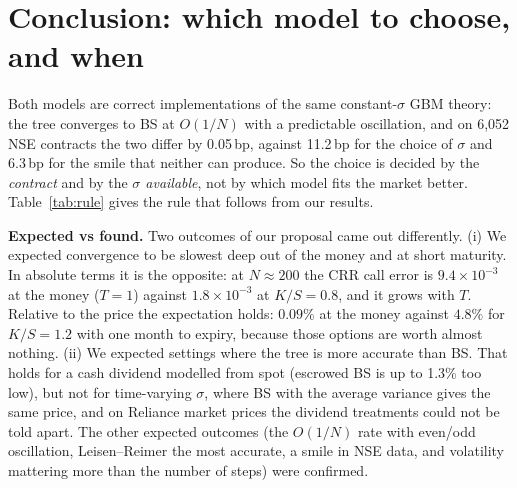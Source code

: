 \documentclass[10pt,a4paper]{article}
\begin{document}
\section{Conclusion: which model to choose, and when}
Both models are correct implementations of the same constant-$\sigma$ GBM theory: the tree converges to BS at
$O(1/N)$ with a predictable oscillation, and on 6{,}052 NSE contracts the two differ by 0.05\,bp, against 11.2\,bp for
the choice of $\sigma$ and 6.3\,bp for the smile that neither can produce. So the choice is decided by the
\emph{contract} and by the \emph{$\sigma$ available}, not by which model fits the market better. Table~\ref{tab:rule}
gives the rule that follows from our results.

\textbf{Expected vs found.} Two outcomes of our proposal came out differently. (i) We expected convergence to be
slowest deep out of the money and at short maturity. In absolute terms it is the opposite: at $N\approx200$ the CRR
call error is $9.4\times10^{-3}$ at the money ($T=1$) against $1.8\times10^{-3}$ at $K/S=0.8$, and it grows with $T$.
Relative to the price the expectation holds: $0.09\%$ at the money against $4.8\%$ for $K/S=1.2$ with one month
to expiry, because those options are worth almost nothing. (ii) We expected settings where the tree is more
accurate than BS. That holds for a cash dividend modelled from spot (escrowed BS is up to 1.3\% too low), but not
for time-varying $\sigma$, where BS with the average variance gives the same price, and on Reliance market prices
the dividend treatments could not be told apart. The other expected outcomes (the $O(1/N)$ rate with even/odd
oscillation, Leisen--Reimer the most accurate, a smile in NSE data, and volatility mattering more than the number
of steps) were confirmed.
\end{document}
